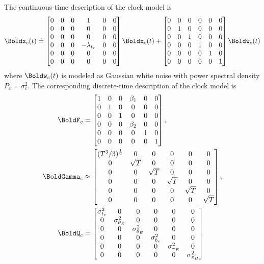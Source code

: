 \noindent
The continuous-time description of the clock model is 
\begin{align}
	\dot{\Boldx}_c(t) \doteq 
	\begin{bmatrix}
		0 & 0 & 0 & 1 & 0 & 0\\
		0 & 0 & 0 & 0 & 0 & 0\\ 
		0 & 0 & 0 & 0 & 0 & 0\\  
		0 & 0 & 0 & -\lambda_{t_r} & 0 & 0 \\
		0 & 0 & 0 & 0 & 0 & 0 \\
		0 & 0 & 0 & 0 & 0 & 0
	\end{bmatrix} 
	\Boldx_c(t) +
	\begin{bmatrix} 
		0 & 0 & 0 & 0 & 0 & 0 \\ 
		0 & 1 & 0 & 0 & 0 & 0 \\ 
		0 & 0 & 1 & 0 & 0 & 0 \\ 
		0 & 0 & 0 & 1 & 0 & 0 \\ 
		0 & 0 & 0 & 0 & 1 & 0 \\
		0 & 0 & 0 & 0 & 0 & 1
	\end{bmatrix} 
	\Boldw_c(t)
\end{align}
where $\Boldw_c(t)$ is modeled as Gaussian white noise with power spectral density $P_c = \sigma_c^2$. 
The corresponding discrete-time description of the clock model is 
\begin{align}
	\BoldF_c &= 
	\begin{bmatrix}
		1 & 0 & 0 & \beta_1 & 0 & 0 \\ 
		0 & 1 & 0 & 0 & 0 & 0 \\
		0 & 0 & 1 & 0 & 0 & 0 \\
		0 & 0 & 0 & \beta_2 & 0 & 0 \\
		0 & 0 & 0 & 0 & 1 & 0 \\
		0 & 0 & 0 & 0 & 0 & 1 
	\end{bmatrix}, ~ \\
	\BoldGamma_c & \approx
	\begin{bmatrix}
		(T^3 / 3)^{\frac{1}{2}} & 0 & 0 & 0 & 0 & 0 \\
		0 & \sqrt{T} & 0 & 0 & 0 & 0 \\
		0 & 0 & \sqrt{T} & 0 & 0 & 0 \\
		0 & 0 & 0 & \sqrt{T} & 0 & 0 \\
		0 & 0 & 0 & 0 & \sqrt{T} & 0 \\
		0 & 0 & 0 & 0 & 0 & \sqrt{T}
	\end{bmatrix}, \\ 
	\BoldQ_{c} &= 
	\begin{bmatrix}
		\sigma_{t_r}^2 & 0 & 0 & 0 & 0 & 0 \\
		0 & \sigma_{\theta_E}^2 & 0 & 0 & 0 & 0 \\
		0 & 0 & \sigma_{\theta_B}^2 & 0 & 0 & 0 \\ 
		0 & 0 & 0 & \sigma_{b_r}^2 & 0 & 0 \\
		0 & 0 & 0 & 0 & \sigma_{\pi_E}^2 & 0 \\
		0 & 0 & 0 & 0 & 0 & \sigma_{\pi_B}^2
	\end{bmatrix}
\end{align}

